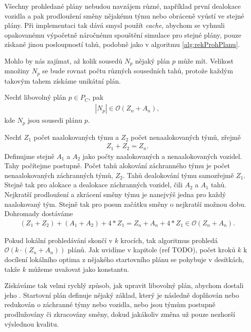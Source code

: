 Všechny prohledané plány nebudou navzájem různé,
například první dealokace vozidla a pak prodloužení směny nějakému týmu nebo obráceně vyústí ve stejné plány.
Při implementaci tak dává smysl použít \textit{cache},
abychom se vyhnuli opakovanému výpočetně náročnému spouštění simulace pro stejné plány, pouze získané jinou posloupností tahů, podobně jako v algoritmu \ref{alg:rekProhPlanu}.

Mohlo by nás zajímat, až kolik sousedů $N_p$ nějaký plán $p$ může mít.
Velikost množiny $N_p$ se bude rovnat počtu různých sousedních tahů, 
protože každým takovým tahem získáme unikátní plán. 

\begin{veta}
  Nechť libovolný plán $p \in P_C$, pak
  \begin{align*}
  |N_p| \in \mathcal{O}(Z_n + A_n),
  \end{align*}
  kde $N_p$ jsou sousedi plánu $p$.
\end{veta}
\begin{dukaz}
  Nechť $Z_1$ počet naalokovaných týmu a $Z_2$ počet nenaalokovaných týmů, zřejmě
  \begin{align*}
    Z_1 + Z_2 = Z_n.
  \end{align*}
  Definujme stejně $A_1$ a $A_2$ jako počty naalokovaných a nenaalokovaných vozidel.
  Tahy počítejme postupně.
  Počet tahů alokování záchranného týmu je počet nenaalokovaných záchranných týmů, $Z_2$.
  Tahů dealokování týmu samozřejmě $Z_1$.
  Stejně tak pro alokace a dealokace záchranných vozidel, čili $A_2$ a $A_1$ tahů.
  Nejkratší prodloužení a zkrácení směny týmu je nanejvýš jedna pro každý naalokovaný tým.
  Stejně tak pro posun začátku směny o nejkratší možnou dobu.
  Dohromady dostáváme
  \begin{align*}
    (Z_1 + Z_2) + (A_1 + A_2) + 4 * Z_1 = Z_n + A_n + 4 * Z_1 \in \mathcal{O}(Z_n + A_n).
  \end{align*}
\end{dukaz}

Pokud lokální prohledávání skončí v $k$ krocích, tak algoritmus prohledá $\mathcal{O}(k \cdot (Z_n + A_n))$ plánů.
Jak uvidíme v kapitole (ref TODO), počet kroků $k$ k docílení lokálního optima z nějakého startovního plánu se pohybuje v desítkách,
takže $k$ můžeme uvažovat jako konstantu.

Získáváme tak velmi rychlý způsob, jak upravit libovolný plán, abychom dostali jeho . 
Startovní plán definuje nějaký základ, který je následně doplňován nebo redukován o záchranné týmy nebo vozidla,
nebo jsou týmům postupně prodlužovány či zkracovány směny,
dokud jakákoliv změna už pouze nezhorší výslednou kvalitu. 


